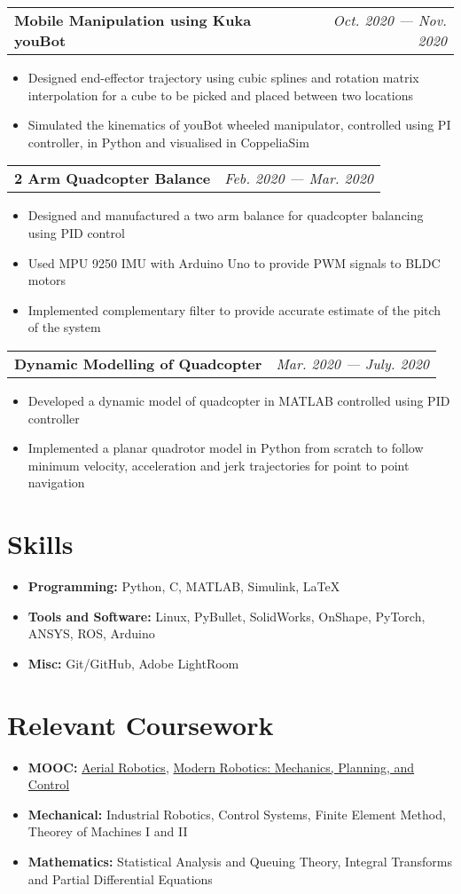 \documentclass[a4paper,11pt]{article}
\makeatletter
\newcommand{\resumeItem}[2]{
  \item\small{
    \textbf{#1}{#2 \vspace{-5pt}}
  }
}
\newcommand{\projectHeading}[2]{
\vspace{-1pt}
    \begin{tabular*}{0.99\textwidth}[t]{l@{\extracolsep{\fill}}r}
      \textbf{#1} & \textit{\small #2} \\
    \end{tabular*}\vspace{-6pt}





}
\newcommand{\resumeSubHeadingListStart}{\begin{itemize}[leftmargin=*]}
\newcommand{\resumeSubHeadingListEnd}{\end{itemize}}
\newcommand{\resumeItemListStart}{\begin{itemize}}
\newcommand{\resumeItemListEnd}{\end{itemize}\vspace{1pt}}
\makeatother
\begin{document}
    \projectHeading
        {Mobile Manipulation using Kuka youBot}{Oct. 2020 --- Nov. 2020}
        \resumeItemListStart
            \resumeItem{}{Designed end-effector trajectory using cubic splines and rotation matrix interpolation for a cube to be picked and placed between two locations}
            \resumeItem{}{Simulated the kinematics of youBot wheeled manipulator, controlled using PI controller, in Python and visualised in CoppeliaSim}
        \resumeItemListEnd
\newpage
    \projectHeading
        {2 Arm Quadcopter Balance}{Feb. 2020 --- Mar. 2020}
        \resumeItemListStart
            \resumeItem{}{Designed and manufactured a two arm balance for quadcopter balancing using PID control}
            \resumeItem{}{Used MPU 9250 IMU with Arduino Uno to provide PWM signals to BLDC motors}
            \resumeItem{}{Implemented complementary filter to provide accurate estimate of the pitch of the system}
        \resumeItemListEnd


    \projectHeading
        {Dynamic Modelling of Quadcopter}{Mar. 2020 --- July. 2020}
        \resumeItemListStart
            \resumeItem{}{Developed a dynamic model of quadcopter in MATLAB controlled using PID controller}
            \resumeItem{}{Implemented a planar quadrotor model in Python from scratch to follow minimum velocity, acceleration and jerk trajectories for point to point navigation}
        \resumeSubHeadingListEnd
\vspace{-3mm}
\section{Skills}
    \resumeSubHeadingListStart
        \resumeItem{Programming: }{Python, C, MATLAB, Simulink, \LaTeX}
        \resumeItem{Tools and Software: }{Linux, PyBullet, SolidWorks, OnShape, PyTorch, ANSYS, ROS, Arduino}
        \resumeItem{Misc: }{Git/GitHub, Adobe LightRoom}
    \resumeSubHeadingListEnd
\section{Relevant Coursework}
    \resumeSubHeadingListStart
        \resumeItem{MOOC: }{\href{https://coursera.org/share/ea3f882b4fcd497819e00607c1e7be82}{Aerial Robotics}, \href{https://coursera.org/share/5d302e73bc18fe9fe2ff152a5bac61ff}{Modern Robotics: Mechanics, Planning, and Control}}
        \resumeItem{Mechanical: }{Industrial Robotics, Control Systems, Finite Element Method, Theorey of Machines I and II}
        \resumeItem{Mathematics: }{Statistical Analysis and Queuing Theory, Integral Transforms and Partial Differential Equations}
    \resumeSubHeadingListEnd
\end{document}

